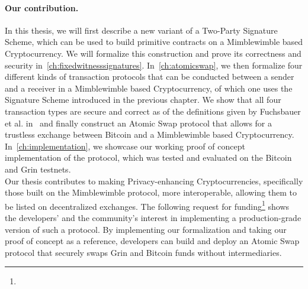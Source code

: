 \paragraph{Our contribution.} In this thesis, we will first describe a new variant of a Two-Party Signature Scheme, which can be used to build primitive contracts on a Mimblewimble based Cryptocurrency.
We will formalize this construction and prove its correctness and security in~\cref{ch:fixedwitnesssignatures}.
In~\cref{ch:atomicswap}, we then formalize four different kinds of transaction protocols that can be conducted between a sender and a receiver in a Mimblewimble based Cryptocurrency, of which one uses the Signature Scheme introduced in the previous chapter.
We show that all four transaction types are secure and correct as of the definitions given by Fuchsbauer et al. in~\cite{fuchsbauer2019aggregate} and finally construct an Atomic Swap protocol that allows for a trustless exchange between Bitcoin and a Mimblewimble based Cryptocurrency.
In~\cref{ch:implementation}, we showcase our working proof of concept implementation of the protocol, which was tested and evaluated on the Bitcoin and Grin testnets.\\
Our thesis contributes to making Privacy-enhancing Cryptocurrencies, specifically those built on the Mimblewimble protocol, more interoperable, allowing them to be listed on decentralized exchanges.
The following request for funding\footnote{\urlgrinfund} shows the developers' and the community's interest in implementing a production-grade version of such a protocol.
By implementing our formalization and taking our proof of concept as a reference, developers can build and deploy an Atomic Swap protocol that securely swaps Grin and Bitcoin funds without intermediaries.